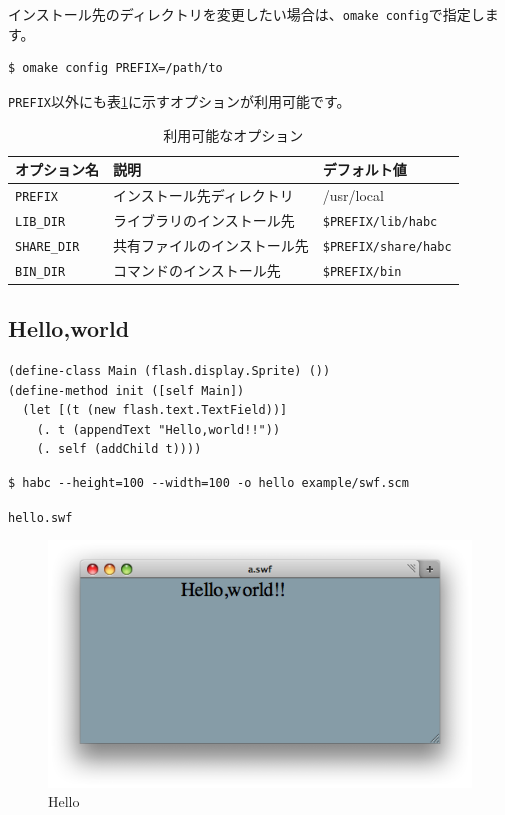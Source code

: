 \documentclass{article}
\begin{document}
インストール先のディレクトリを変更したい場合は、\verb!omake config!で指定します。

\begin{verbatim}
$ omake config PREFIX=/path/to
\end{verbatim}

\verb!PREFIX!以外にも表\ref{option}に示すオプションが利用可能です。

\begin{table}
\centering
\caption{利用可能なオプション}\label{option}
\begin{tabular}{|l|l|l|}
\hline
オプション名     & 説明 & デフォルト値 \\\hline
\verb!PREFIX!    & インストール先ディレクトリ & /usr/local \\
\verb!LIB_DIR!   & ライブラリのインストール先 & \verb!$PREFIX/lib/habc! \\
\verb!SHARE_DIR! & 共有ファイルのインストール先 & \verb!$PREFIX/share/habc! \\
\verb!BIN_DIR!   & コマンドのインストール先     & \verb!$PREFIX/bin! \\
\hline
\end{tabular}
\end{table}

\subsection{Hello,world}

\begin{verbatim}
(define-class Main (flash.display.Sprite) ())
(define-method init ([self Main])
  (let [(t (new flash.text.TextField))]
    (. t (appendText "Hello,world!!"))
    (. self (addChild t))))
\end{verbatim}

\begin{verbatim}
$ habc --height=100 --width=100 -o hello example/swf.scm
\end{verbatim}

\verb!hello.swf!

\begin{figure}
\centering
\includegraphics{hello.png}
\caption{Hello}\label{hello}
\end{figure}
\end{document}
